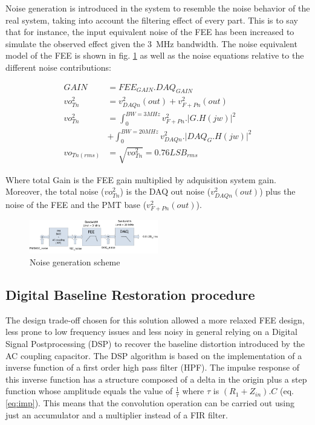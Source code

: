 \documentclass[a4paper, 10pt, oneside, twocolumn, 3p]{elsarticle}
\begin{document}
Noise generation is introduced in the system to resemble the noise behavior of the real system, taking into account the filtering effect of every part. This is to say that for instance, the input equivalent noise of the FEE has been increased to simulate the observed effect given the 3~MHz bandwidth. The noise equivalent model of the FEE is shown in fig. \ref{fig:noise_eq} as well as the noise equations relative to the different noise contributions:

\begin{align}  
GAIN &= FEE_{GAIN}.DAQ_{GAIN} \\ 
vo_{Tn}^{2} &= v_{DAQn}^{2}(out) + v_{F+Pn}^{2}(out) \\
vo_{Tn}^{2} &= \int_{0}^{BW=3MHz}{v_{F+Pn}^{2}.{\lvert}G.H(jw){\rvert}^2}  \\
& + \int_{0}^{BW=20MHz}{v_{DAQn}^{2}.{\lvert}DAQ_{G}.H(jw){\rvert}^2}\\  
vo_{Tn(rms)} &= \sqrt{vo_{Tn}^{2}} = 0.76LSB_{rms}
\end{align}


Where total Gain is the FEE gain multiplied by adquisition system gain. Moreover, the total noise ($vo_{Tn}^{2}$) is the DAQ out noise ($v_{DAQn}^{2}(out)$) plus the noise of the FEE and the PMT base ($v_{F+Pn}^{2}(out)$).

\begin{figure}
	\begin{center}
		\includegraphics[width=0.5\textwidth]{./figures/NOISE.png}
		\caption{Noise generation scheme}
		\label{fig:noise_eq}
	\end{center}
\end{figure}


\subsection{Digital Baseline Restoration procedure}
\label{Digi_base_res}

\par The design trade-off chosen for this solution allowed a more relaxed FEE design, less prone to low frequency issues and less noisy in general relying on a Digital Signal Postprocessing (DSP) to recover the baseline distortion introduced by the AC coupling capacitor. The DSP algorithm is based on the implementation of a inverse function of a first order high pass filter (HPF). The impulse response of this inverse function has a structure composed of a delta in the origin plus a step function whose amplitude equals the value of $\frac{1}{\tau}$ where $\tau$ is $(R_1+Z_{in}).C$ (eq. \ref{eq:imp}). This means that the convolution operation can be carried out using just an accumulator and a multiplier instead of a FIR filter.
\end{document}
